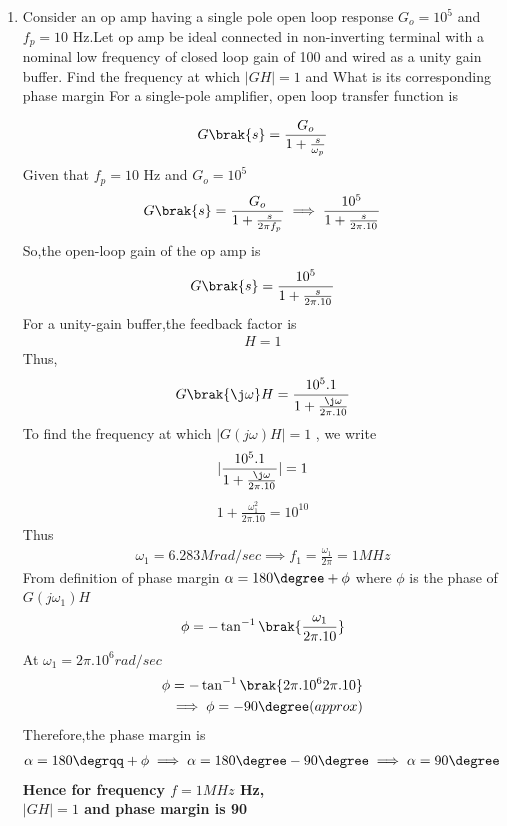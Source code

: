 \begin{enumerate}[label=\thesubsection.\arabic*.,ref=\thesubsection.\theenumi]

\item Consider an op amp having a single pole open loop response $G_{o} = 10^5$ and $f_{p} = 10$ Hz.Let op amp be ideal connected in non-inverting terminal with a nominal low frequency of closed loop gain of 100 and wired as a unity gain buffer.
\subitem Find the frequency at which $|GH| = 1$ and 
What is its corresponding phase margin
\solution  
For a single-pole amplifier, open loop transfer function is 

\begin{align}
    G\brak{s} = \frac{G_{o}}{1+\frac{s}{\omega_{p}}}
\end{align}
Given that $f_{p} = 10$ Hz and $G_{o} =10^5$
\begin{align}
G\brak{s}=\frac{G_{o}}{1+\frac{s}{2\pi f_{p}}}
\implies \frac{10^{5}}{1+\frac{s}{2\pi.10}}
\end{align}
So,the open-loop gain of the op amp is 
\begin{align}
    G\brak{s}=\frac{10^{5}}{1+\frac{s}{2\pi.10}}
\end{align}
For a unity-gain buffer,the feedback factor is
\begin{align}
    H = 1
\end{align}
Thus, 
\begin{align}
    G\brak{\j\omega}H = \frac{10^{5}.1}{1+\frac{\j\omega}{2\pi.10}}
\end{align}
To find the frequency at which $|G(j\omega)H|=1$ , we write
\begin{align}
    |\frac{10^{5}.1}{1+\frac{\j\omega}{2\pi.10}}| = 1
\end{align}
\begin{align}
    {1+\frac{\omega_{1}^2}{2\pi.10}} = 10^{10}
\end{align}
Thus  
\begin{align}
    \omega_{1} = 6.283 Mrad/sec
\implies f_{1} =\frac{\omega_{1}}{2\pi}=1 MHz
\end{align}
From definition of phase margin $\alpha = 180\degree + \phi$
where $\phi$ is the phase of $G(j\omega_{1})H$
\begin{align}
\phi = -\tan^{-1}\brak{\frac{\omega_{1}}{2\pi.10}}
\label{eq:ee18btech11012_phaseGH}
\end{align}
At $\omega_{1} = 2\pi.10^{6}rad/sec$
\begin{align}
    \phi = -\tan^{-1}\brak{{2\pi.10^{6}}{2\pi.10}}
    \\
    \implies \phi = -90\degree (approx)
\end{align}
Therefore,the phase margin is
\begin{align}
    \alpha = 180\degrqq + \phi
    \implies \alpha = 180\degree - 90\degree
    \implies  \alpha = 90\degree
\end{align}
\textbf{Hence for frequency $f = 1 MHz$ Hz,\\
 $|GH| = 1$ and phase margin is 90\degree}


\end{enumerate}
